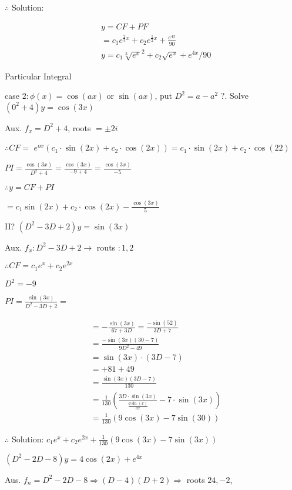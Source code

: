 \documentclass[12pt, a4paper]{article}
\begin{document}
$\therefore$ Solution:

$$
\begin{aligned}
& y=C F+P F \\
& =c_{1} e^{\frac{2}{3} x}+c_{2} e^{\frac{1}{2} x}+\frac{e^{4 x}}{90} \\
& y=c_{1}{\sqrt[3]{e^{x}}}^{2}+c_{2} \sqrt{e^{x}}+e^{4 x} / 90
\end{aligned}
$$

Particular Integral

case $2: \phi(x)=\cos (a x)$ or $\sin (a x)$, put $D^{2}=a-a^{2}$ ?. Solve $\left(0^{2}+4\right) y=\cos (3 x)$

Aux. $f_{x}=D^{2}+4$, roots $= \pm 2 i$

$\therefore C F=$ $e^{o x}\left(c_{1} \cdot \sin (2 x)+c_{2} \cdot \cos (2 x)\right)=c_{1} \cdot \sin (2 x)+c_{2} \cdot \cos (22)$

$P I=\frac{\cos (3 x)}{D^{2}+4}=\frac{\cos (3 x)}{-9+4}=\frac{\cos (3 x)}{-5}$

$\therefore y=C F+P I$

$=c_{1} \sin (2 x)+c_{2} \cdot \cos (2 x)-\frac{\cos (3 x)}{5}$

II? $\left(D^{2}-3 D+2\right) y=\sin (3 x)$

Aux. $f_{x}: D^{2}-3 D+2 \rightarrow$ routs $: 1,2$

$\therefore C F=c_{1} e^{x}+c_{2} e^{2 x}$

$D^{2}=-9$

$P I=\frac{\sin (3 x)}{D^{2}-3 D+2}=$

$$
\begin{aligned}
& =-\frac{\sin (3 x)}{67+3 D}=\frac{-\sin (52)}{3 D+7} \\
& =\frac{-\sin (3 x)(30-7)}{9 D^{2}-49} \\
& =\sin (3 x) \cdot(3 D-7) \\
& =+81+49 \\
& =\frac{\sin (3 x)(3 D-7)}{130} \\
& =\frac{1}{130}\left(\frac{3 D \cdot \sin (3 x)}{\frac{d \sin (x)}{d x}}-7 \cdot \sin (3 x)\right) \\
& =\frac{1}{130}(9 \cos (3 x)-7 \sin (30))
\end{aligned}
$$

$\therefore$ Solution: $c_{1} e^{x}+c_{2} e^{2 x}+\frac{1}{130}(9 \cos (3 x)-7 \sin (3 x))$

$\left(D^{2}-2 D-8\right) y=4 \cos (2 x)+e^{4 x}$

Aus. $f_{n}=D^{2}-2 D-8 \Rightarrow(D-4)(D+2) \Rightarrow$ roots $24,-2$,
\end{document}
